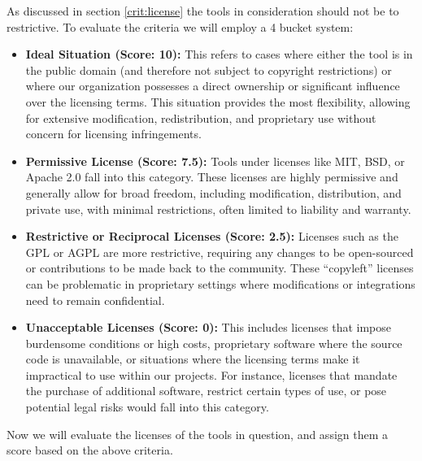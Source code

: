 As discussed in section \ref{crit:license} the tools in consideration should not be to restrictive.
To evaluate the criteria we will employ a 4 bucket system: 
\begin{itemize}
    \item \textbf{Ideal Situation (Score: 10):} 
    This refers to cases where either the tool is in the public domain (and therefore not subject to copyright restrictions) or where our organization possesses a direct ownership or significant influence over the licensing terms.
    This situation provides the most flexibility, allowing for extensive modification, redistribution, and proprietary use without concern for licensing infringements.


    \item \textbf{Permissive License (Score: 7.5):}
    Tools under licenses like MIT, BSD, or Apache 2.0 fall into this category.
    These licenses are highly permissive and generally allow for broad freedom, including modification, distribution, and private use, with minimal restrictions, often limited to liability and warranty.

    \item \textbf{Restrictive or Reciprocal Licenses (Score: 2.5):}
    Licenses such as the GPL or AGPL are more restrictive, requiring any changes to be open-sourced or contributions to be made back to the community.
    These “copyleft” licenses can be problematic in proprietary settings where modifications or integrations need to remain confidential.

    \item \textbf{Unacceptable Licenses (Score: 0):}
    This includes licenses that impose burdensome conditions or high costs, proprietary software where the source code is unavailable, or situations where the licensing terms make it impractical to use within our projects.
    For instance, licenses that mandate the purchase of additional software, restrict certain types of use, or pose potential legal risks would fall into this category.
\end{itemize}

Now we will evaluate the licenses of the tools in question, and assign them a score based on the above criteria.

